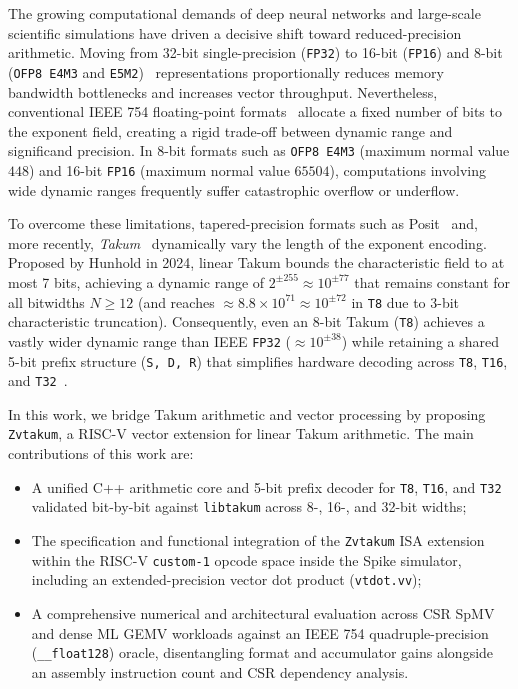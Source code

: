 \documentclass[conference]{IEEEtran}
\begin{document}
The growing computational demands of deep neural networks and large-scale scientific simulations have driven a decisive shift toward reduced-precision arithmetic. Moving from 32-bit single-precision (\texttt{FP32}) to 16-bit (\texttt{FP16}) and 8-bit (\texttt{OFP8 E4M3} and \texttt{E5M2})~\cite{ocp_fp8} representations proportionally reduces memory bandwidth bottlenecks and increases vector throughput. Nevertheless, conventional IEEE 754 floating-point formats~\cite{ieee754} allocate a fixed number of bits to the exponent field, creating a rigid trade-off between dynamic range and significand precision. In 8-bit formats such as \texttt{OFP8 E4M3} (maximum normal value $448$) and 16-bit \texttt{FP16} (maximum normal value $65504$), computations involving wide dynamic ranges frequently suffer catastrophic overflow or underflow.

To overcome these limitations, tapered-precision formats such as Posit~\cite{gustafson2017posit} and, more recently, \emph{Takum}~\cite{hunhold2024takum} dynamically vary the length of the exponent encoding. Proposed by Hunhold in 2024, linear Takum bounds the characteristic field to at most 7 bits, achieving a dynamic range of $2^{\pm 255} \approx 10^{\pm 77}$ that remains constant for all bitwidths $N \ge 12$ (and reaches $\approx 8.8 \times 10^{71} \approx 10^{\pm 72}$ in \texttt{T8} due to 3-bit characteristic truncation). Consequently, even an 8-bit Takum (\texttt{T8}) achieves a vastly wider dynamic range than IEEE \texttt{FP32} ($\approx 10^{\pm 38}$) while retaining a shared 5-bit prefix structure (\texttt{S, D, R}) that simplifies hardware decoding across \texttt{T8}, \texttt{T16}, and \texttt{T32}~\cite{hunhold2025avx}.

In this work, we bridge Takum arithmetic and vector processing by proposing \texttt{Zvtakum}, a RISC-V vector extension for linear Takum arithmetic. The main contributions of this work are:
\begin{itemize}
    \item A unified C++ arithmetic core and 5-bit prefix decoder for \texttt{T8}, \texttt{T16}, and \texttt{T32} validated bit-by-bit against \texttt{libtakum} across 8-, 16-, and 32-bit widths;
    \item The specification and functional integration of the \texttt{Zvtakum} ISA extension within the RISC-V \texttt{custom-1} opcode space inside the Spike simulator, including an extended-precision vector dot product (\texttt{vtdot.vv});
    \item A comprehensive numerical and architectural evaluation across CSR SpMV and dense ML GEMV workloads against an IEEE 754 quadruple-precision (\texttt{\_\_float128}) oracle, disentangling format and accumulator gains alongside an assembly instruction count and CSR dependency analysis.
\end{itemize}
\end{document}

